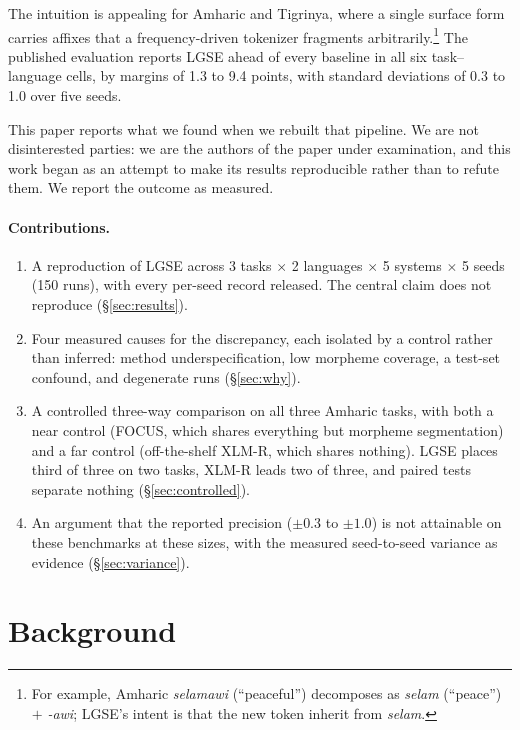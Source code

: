\documentclass[11pt]{article}
\begin{document}
The intuition is appealing for Amharic and Tigrinya, where a single surface
form carries affixes that a frequency-driven tokenizer fragments
arbitrarily.\footnote{For example, Amharic \textit{selamawi} (``peaceful'')
decomposes as \textit{selam} (``peace'') ${+}$ \textit{-awi}; LGSE's
intent is that the new token inherit from \textit{selam}.}
The published evaluation reports LGSE ahead of every baseline in
all six task--language cells, by margins of 1.3 to 9.4 points, with standard
deviations of 0.3 to 1.0 over five seeds.

This paper reports what we found when we rebuilt that pipeline. We are not
disinterested parties: we are the authors of the paper under examination, and
this work began as an attempt to make its results reproducible rather than to
refute them. We report the outcome as measured.

\paragraph{Contributions.}
\begin{enumerate}
\itemsep0em
\item A reproduction of LGSE across 3 tasks $\times$ 2 languages $\times$ 5
  systems $\times$ 5 seeds (150 runs), with every per-seed record released.
  The central claim does not reproduce (\S\ref{sec:results}).
\item Four measured causes for the discrepancy, each isolated by a control
  rather than inferred: method underspecification, low morpheme coverage, a
  test-set confound, and degenerate runs (\S\ref{sec:why}).
\item A controlled three-way comparison on all three Amharic tasks, with
  both a near control (FOCUS, which shares everything but morpheme
  segmentation) and a far control (off-the-shelf XLM-R, which shares
  nothing). LGSE places third of three on two tasks, XLM-R leads two of
  three, and paired tests separate nothing (\S\ref{sec:controlled}).
\item An argument that the reported precision ($\pm 0.3$ to $\pm 1.0$) is
  not attainable on these benchmarks at these sizes, with the measured
  seed-to-seed variance as evidence (\S\ref{sec:variance}).
\end{enumerate}

\section{Background}
\end{document}
